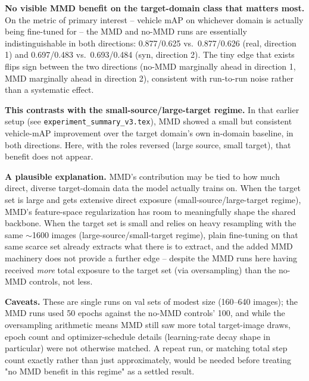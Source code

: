 \documentclass[11pt]{article}
\begin{document}
\textbf{No visible MMD benefit on the target-domain class that matters most.} On the
metric of primary interest -- vehicle mAP on whichever domain is actually being
fine-tuned for -- the MMD and no-MMD runs are essentially indistinguishable in both
directions: 0.877/0.625 vs.\ 0.877/0.626 (real, direction 1) and 0.697/0.483 vs.\
0.693/0.484 (syn, direction 2). The tiny edge that exists flips sign between the two
directions (no-MMD marginally ahead in direction 1, MMD marginally ahead in direction
2), consistent with run-to-run noise rather than a systematic effect.

\textbf{This contrasts with the small-source/large-target regime.} In that earlier
setup (see \texttt{experiment\_summary\_v3.tex}), MMD showed a small but consistent
vehicle-mAP improvement over the target domain's own in-domain baseline, in both
directions. Here, with the roles reversed (large source, small target), that benefit
does not appear.

\textbf{A plausible explanation.} MMD's contribution may be tied to how much direct,
diverse target-domain data the model actually trains on. When the target set is large
and gets extensive direct exposure (small-source/large-target regime), MMD's
feature-space regularization has room to meaningfully shape the shared backbone. When
the target set is small and relies on heavy resampling with the same $\sim$1600 images
(large-source/small-target regime), plain fine-tuning on that same scarce set already
extracts what there is to extract, and the added MMD machinery does not provide a
further edge -- despite the MMD runs here having received \emph{more} total exposure to
the target set (via oversampling) than the no-MMD controls, not less.

\textbf{Caveats.} These are single runs on val sets of modest size (160--640 images);
the MMD runs used 50 epochs against the no-MMD controls' 100, and while the
oversampling arithmetic means MMD still saw more total target-image draws, epoch count
and optimizer-schedule details (learning-rate decay shape in particular) were not
otherwise matched. A repeat run, or matching total step count exactly rather than just
approximately, would be needed before treating "no MMD benefit in this regime" as a
settled result.
\end{document}
